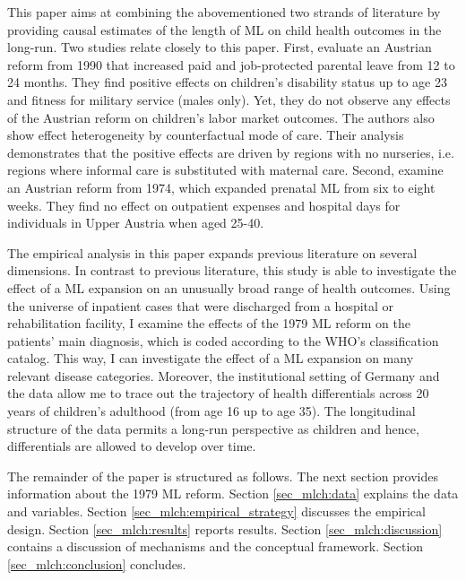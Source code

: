 This paper aims at combining the abovementioned two strands of literature by providing causal estimates of the length of ML on child health outcomes in the long-run. Two studies relate closely to this paper. First, \cite{danzer2019parental} evaluate an Austrian reform from 1990 that increased paid and job-protected parental leave from 12 to 24 months. They find positive effects on children's disability status up to age 23 and fitness for military service (males only). Yet, they do not observe any effects of the Austrian reform on children's labor market outcomes. The authors also show effect heterogeneity by counterfactual mode of care. Their analysis demonstrates that the positive effects are driven by regions with no nurseries, i.e. regions where informal care is substituted with maternal care. Second, \cite{ahammer2020} examine an Austrian reform from 1974, which expanded prenatal ML from six to eight weeks. They find no effect on outpatient expenses and hospital days for individuals in Upper Austria when aged 25-40.



The empirical analysis in this paper expands previous literature on several dimensions. In contrast to previous literature, this study is able to investigate the effect of a ML expansion on an unusually broad range of health outcomes. Using the universe of inpatient cases that were discharged from a hospital or rehabilitation facility, I examine the effects of the 1979 ML reform on the patients' main diagnosis, which is coded according to the WHO's classification catalog. This way, I can investigate the effect of a ML expansion on many relevant disease categories. Moreover, the institutional setting of Germany and the data allow me to trace out the trajectory of health differentials across 20 years of children's adulthood (from age 16 up to age 35). The longitudinal structure of the data permits a long-run perspective as children and hence, differentials are allowed to develop over time.




The remainder of the paper is structured as follows. The next section provides information about the 1979 ML reform. Section \ref{sec_mlch:data} explains the data and variables. Section \ref{sec_mlch:empirical_strategy} discusses the empirical design. Section \ref{sec_mlch:results} reports results. Section \ref{sec_mlch:discussion} contains a discussion of mechanisms and the conceptual framework. Section \ref{sec_mlch:conclusion} concludes.


